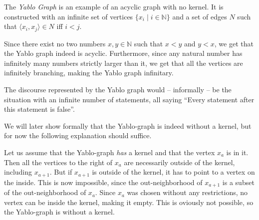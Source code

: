 The \textit{Yablo Graph}\cite{analysis-yablo} is an example of an acyclic graph with no kernel.
It is constructed with an infinite set of vertices $\{ x_i \;|\; i \in \mathbb{N} \}$ and a set of edges $N$ such that $\langle x_i, x_j \rangle \in N$ iff $i < j$.
\begin{figure}[!h]
  \centering
  \caption{}
  \label{fig:yablo-graph}
\end{figure}
Since there exist no two numbers $x,y \in \mathbb{N}$ such that $x < y$ and $y < x$, we get that the Yablo graph indeed is acyclic.
Furthermore, since any natural number has infinitely many numbers strictly larger than it, we get that all the vertices are infinitely branching, making the Yablo graph infinitary.

The discourse represented by the Yablo graph would -- informally -- be the situation with an infinite number of statements, all saying ``Every statement after this statement is false''.

We will later show formally that the Yablo-graph is indeed without a kernel, but for now the following explanation should suffice.

Let us assume that the Yablo-graph \textit{has} a kernel and that the vertex $x_a$ is in it.
Then all the vertices to the right of $x_a$ are necessarily outside of the kernel, including $x_{a+1}$.
But if $x_{a+1}$ is outside of the kernel, it has to point to a vertex on the inside.
This is now impossible, since the out-neighborhood of $x_{a+1}$ is a subset of the out-neighborhood of $x_a$.
Since $x_a$ was chosen without any restrictions, no vertex can be inside the kernel, making it empty.
This is oviously not possible, so the Yablo-graph is without a kernel.


